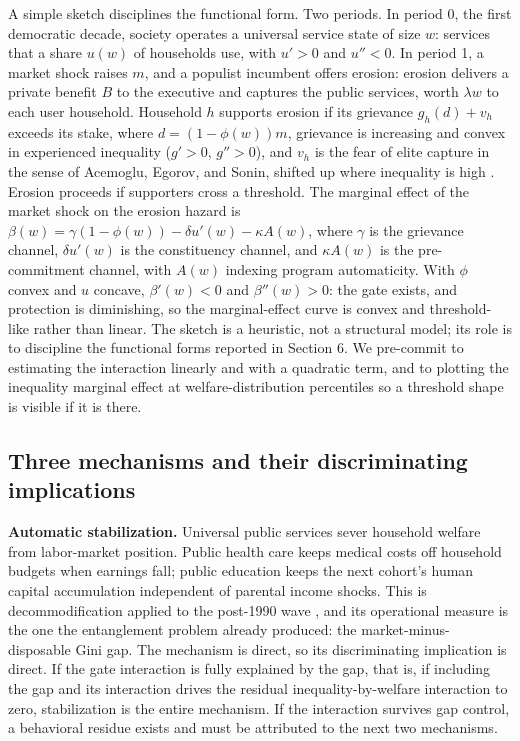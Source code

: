 \documentclass[11pt,letterpaper]{article}
\begin{document}
A simple sketch disciplines the functional form. Two periods. In period 0, the first democratic decade, society operates a universal service state of size $w$: services that a share $u(w)$ of households use, with $u' > 0$ and $u'' < 0$. In period 1, a market shock raises $m$, and a populist incumbent offers erosion: erosion delivers a private benefit $B$ to the executive and captures the public services, worth $\lambda w$ to each user household. Household $h$ supports erosion if its grievance $g_h(d) + v_h$ exceeds its stake, where $d = (1 - \phi(w)) m$, grievance is increasing and convex in experienced inequality ($g' > 0$, $g'' > 0$), and $v_h$ is the fear of elite capture in the sense of Acemoglu, Egorov, and Sonin, shifted up where inequality is high \citep{AcemogluEgorov2013}. Erosion proceeds if supporters cross a threshold. The marginal effect of the market shock on the erosion hazard is $\beta(w) = \gamma(1 - \phi(w)) - \delta u'(w) - \kappa A(w)$, where $\gamma$ is the grievance channel, $\delta u'(w)$ is the constituency channel, and $\kappa A(w)$ is the pre-commitment channel, with $A(w)$ indexing program automaticity. With $\phi$ convex and $u$ concave, $\beta'(w) < 0$ and $\beta''(w) > 0$: the gate exists, and protection is diminishing, so the marginal-effect curve is convex and threshold-like rather than linear. The sketch is a heuristic, not a structural model; its role is to discipline the functional forms reported in Section 6. We pre-commit to estimating the interaction linearly and with a quadratic term, and to plotting the inequality marginal effect at welfare-distribution percentiles so a threshold shape is visible if it is there.

\subsection{Three mechanisms and their discriminating implications}

\textbf{Automatic stabilization.} Universal public services sever household welfare from labor-market position. Public health care keeps medical costs off household budgets when earnings fall; public education keeps the next cohort's human capital accumulation independent of parental income shocks. This is decommodification applied to the post-1990 wave \citep{EspingAndersen1990}, and its operational measure is the one the entanglement problem already produced: the market-minus-disposable Gini gap. The mechanism is direct, so its discriminating implication is direct. If the gate interaction is fully explained by the gap, that is, if including the gap and its interaction drives the residual inequality-by-welfare interaction to zero, stabilization is the entire mechanism. If the interaction survives gap control, a behavioral residue exists and must be attributed to the next two mechanisms.
\end{document}
